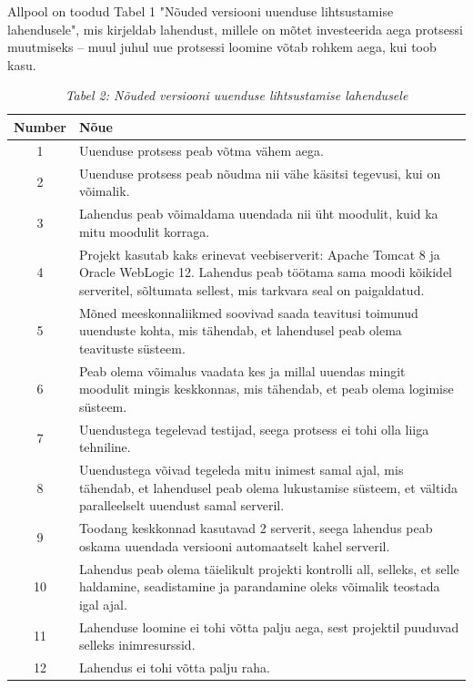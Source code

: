 \documentclass[12pt]{report}
\begin{document}
  Allpool on toodud Tabel 1 "Nõuded versiooni uuenduse lihtsustamise lahendusele", mis kirjeldab lahendust, millele on mõtet investeerida aega protsessi muutmiseks \--- muul juhul uue protsessi loomine võtab rohkem aega, kui toob kasu.
  
  \begin{table}
  \begin{tabular}{|c|p{11cm}|}
    \hline
    \textbf{Number} & \textbf{Nõue}\\
    \hline
    1 & Uuenduse protsess peab võtma vähem aega.\\
    \hline
    2 & Uuenduse protsess peab nõudma nii vähe käsitsi tegevusi, kui on võimalik.\\
    \hline
    3 & Lahendus peab võimaldama uuendada nii üht moodulit, kuid ka mitu moodulit korraga.\\
    \hline
    4 & Projekt kasutab kaks erinevat veebiserverit: Apache Tomcat 8 ja Oracle WebLogic 12. Lahendus peab töötama sama moodi kõikidel serveritel, sõltumata sellest, mis tarkvara seal on paigaldatud.\\
    \hline
    5 & Mõned meeskonnaliikmed soovivad saada teavitusi toimunud uuenduste kohta, mis tähendab, et lahendusel peab olema teavituste süsteem.\\
    \hline
    6 & Peab olema võimalus vaadata kes ja millal uuendas mingit moodulit mingis keskkonnas, mis tähendab, et peab olema logimise süsteem.\\
    \hline
    7 & Uuendustega tegelevad testijad, seega protsess ei tohi olla liiga tehniline.\\
    \hline
    8 & Uuendustega võivad tegeleda mitu inimest samal ajal, mis tähendab, et lahendusel peab olema lukustamise süsteem, et vältida paralleelselt uuendust samal serveril.\\
    \hline
    9 & Toodang keskkonnad kasutavad 2 serverit, seega lahendus peab oskama uuendada versiooni automaatselt kahel serveril.\\
    \hline
    10 & Lahendus peab olema täielikult projekti kontrolli all, selleks, et selle haldamine, seadistamine ja parandamine oleks võimalik teostada igal ajal.\\
    \hline
    11 & Lahenduse loomine ei tohi võtta palju aega, sest projektil puuduvad selleks inimresurssid.\\
    \hline
    12 & Lahendus ei tohi võtta palju raha.\\
    \hline
  \end{tabular}
  \caption*{\textit{Tabel 2: Nõuded versiooni uuenduse lihtsustamise lahendusele}}
  \end{table}
  
\end{document}
